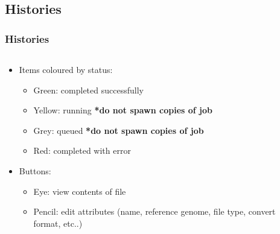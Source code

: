 \documentclass{beamer}              %
\begin{document}
\subsection{Histories}
\begin{frame}
\frametitle{Histories}
  \begin{columns}[T]
    \begin{column}{.82\textwidth}
	\begin{itemize}
	\item Items coloured by status:
		\begin{itemize}
		\item Green: completed successfully
		\item Yellow: running {\scriptsize \textbf{*do not spawn copies of job}}
		\item Grey: queued {\scriptsize \textbf{*do not spawn copies of job}}
		\item Red: completed with error
		\end{itemize}
	\item Buttons:
		\begin{itemize}
		\item Eye: view contents of file
		\item Pencil: edit attributes (name, reference genome, file type, convert format, etc..)
		\end{itemize}
	\end{itemize}
    \end{column}
    \begin{column}{.18\textwidth}

\end{column}
\end{columns}
\end{frame}
\end{document}
